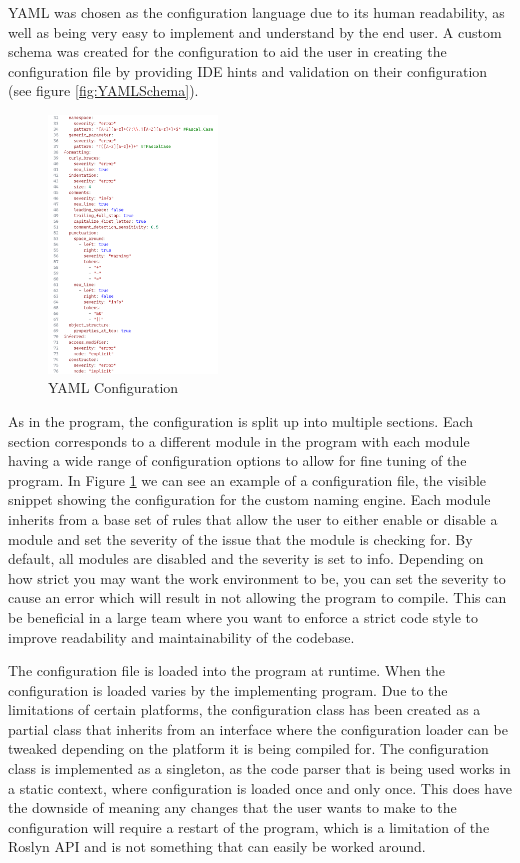 YAML was chosen as the configuration language due to its human readability, as well as being very easy to implement and understand by the end user. A custom schema was created for the configuration to aid the user in creating the configuration file by providing IDE hints and validation on their configuration (see figure \ref{fig:YAMLSchema}).

\begin{figure}
    \centering
    \caption{YAML Configuration}
    \label{fig:YAMLConfiguration}
    \includegraphics[width=0.4\textwidth]{Figures/YAMLConfigurationCropped.png}
\end{figure}

As in the program, the configuration is split up into multiple sections. Each section corresponds to a different module in the program with each module having a wide range of configuration options to allow for fine tuning of the program. In Figure \ref{fig:YAMLConfiguration} we can see an example of a configuration file, the visible snippet showing the configuration for the custom naming engine. Each module inherits from a base set of rules that allow the user to either enable or disable a module and set the severity of the issue that the module is checking for. By default, all modules are disabled and the severity is set to info. Depending on how strict you may want the work environment to be, you can set the severity to cause an error which will result in not allowing the program to compile. This can be beneficial in a large team where you want to enforce a strict code style to improve readability and maintainability of the codebase.

The configuration file is loaded into the program at runtime. When the configuration is loaded varies by the implementing program. Due to the limitations of certain platforms, the configuration class has been created as a partial class that inherits from an interface where the configuration loader can be tweaked depending on the platform it is being compiled for. The configuration class is implemented as a singleton, as the code parser that is being used works in a static context, where configuration is loaded once and only once. This does have the downside of meaning any changes that the user wants to make to the configuration will require a restart of the program, which is a limitation of the Roslyn API and is not something that can easily be worked around.

